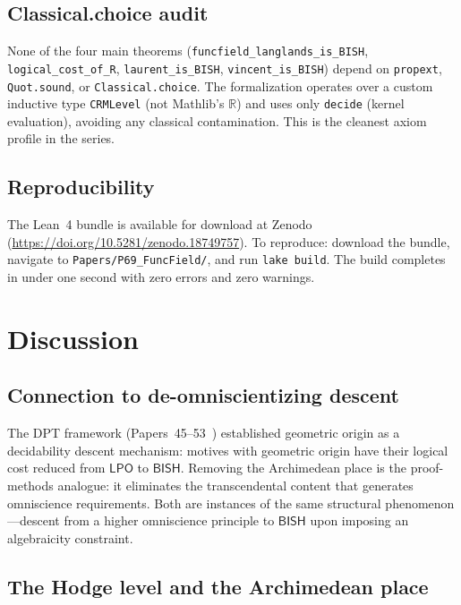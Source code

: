 \documentclass[11pt]{article}
\theoremstyle{plain}
\theoremstyle{definition}
\theoremstyle{remark}
\newcommand{\R}{\mathbb{R}}
\newcommand{\BISH}{\mathsf{BISH}}
\newcommand{\LPO}{\mathsf{LPO}}
\begin{document}
\subsection{Classical.choice audit}

None of the four main theorems (\texttt{funcfield\_langlands\_is\_BISH},
\texttt{logical\_cost\_of\_R}, \texttt{laurent\_is\_BISH},
\texttt{vincent\_is\_BISH}) depend on \texttt{propext}, \texttt{Quot.sound},
or \texttt{Classical.choice}. The formalization operates over a custom inductive
type \texttt{CRMLevel} (not Mathlib's $\R$) and uses only \texttt{decide}
(kernel evaluation), avoiding any classical contamination. This is the cleanest
axiom profile in the series.

\subsection{Reproducibility}

The Lean~4 bundle is available for download at Zenodo
(\url{https://doi.org/10.5281/zenodo.18749757}). To reproduce: download the
bundle, navigate to \texttt{Papers/P69\_FuncField/}, and run \texttt{lake build}.
The build completes in under one second with zero errors and zero warnings.

\section{Discussion}\label{sec:discussion}

\subsection{Connection to de-omniscientizing descent}

The DPT framework (Papers~45--53~\cite{Paper45,Paper53}) established geometric
origin as a decidability descent mechanism: motives with geometric origin have
their logical cost reduced from $\LPO$ to $\BISH$. Removing the Archimedean
place is the proof-methods analogue: it eliminates the transcendental content
that generates omniscience requirements. Both are instances of the same
structural phenomenon---descent from a higher omniscience principle to $\BISH$
upon imposing an algebraicity constraint.

\subsection{The Hodge level and the Archimedean place}
\end{document}
